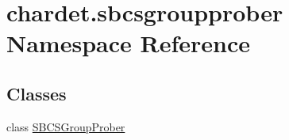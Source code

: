 \hypertarget{namespacechardet_1_1sbcsgroupprober}{}\section{chardet.\+sbcsgroupprober Namespace Reference}
\label{namespacechardet_1_1sbcsgroupprober}
\subsection*{Classes}
\begin{DoxyCompactItemize}
\item 
class \hyperlink{classchardet_1_1sbcsgroupprober_1_1_s_b_c_s_group_prober}{S\+B\+C\+S\+Group\+Prober}
\end{DoxyCompactItemize}
